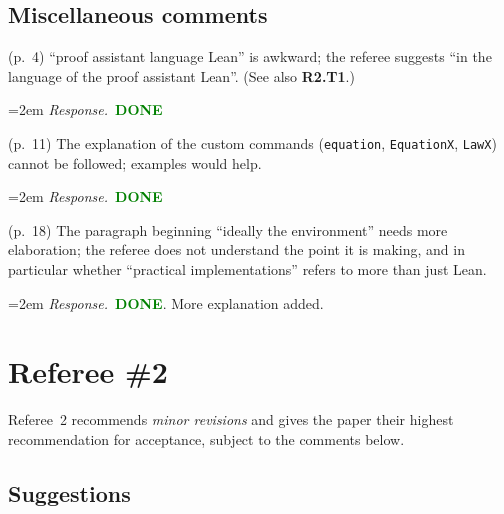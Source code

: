 \documentclass[11pt]{amsart}
\newcommand{\done}{\textcolor{green}{\textbf{DONE}}}
\newcommand{\response}[1]{%
  \par\smallskip
  \noindent\hangindent=2em\hangafter=1
  \textit{Response.}\ #1
  \par\smallskip}
\newcommand{\rlabel}{R}
\begin{document}
\subsection*{Miscellaneous comments}

\begin{requests}[label=\textbf{R1.M\arabic*}]

\item (p.~4) ``proof assistant language Lean'' is awkward; the referee suggests
``in the language of the proof assistant Lean''. (See also \textbf{R2.T1}.)
\response{\done}

\item (p.~11) The explanation of the custom commands (\texttt{equation},
\texttt{EquationX}, \texttt{LawX}) cannot be followed; examples would help.
\response{\done}

\item (p.~18) The paragraph beginning ``ideally the environment'' needs more
elaboration; the referee does not understand the point it is making, and in particular
whether ``practical implementations'' refers to more than just Lean.
\response{\done. More explanation added.}

\end{requests}

\section*{Referee \#2}
\renewcommand{\rlabel}{R2}

Referee~2 recommends \emph{minor revisions} and gives the paper their highest
recommendation for acceptance, subject to the comments below.

\subsection*{Suggestions}
\end{document}
